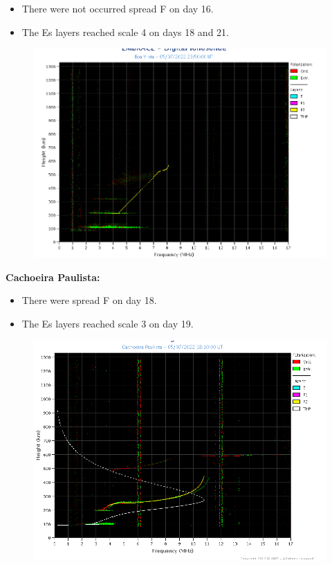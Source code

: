 \documentclass[a4paper, 10pt]{article}
\begin{document}
 \begin{itemize}
\item There were not occurred spread F on day 16.
\item The Es layers reached scale 4 on days 18 and 21.
\end{itemize}
\begin{figure}[H]
    
                        \centering
   
                             \includegraphics[width=14cm]{./figures//BoaVista.png}

                        \end{figure}

                     
\textbf{Cachoeira Paulista:}

 \begin{itemize}
\item There were spread F on day 18.
\item The Es layers reached scale 3 on day 19. 
\end{itemize}
\begin{figure}[H]
    
                        \centering
   
                             \includegraphics[width=14cm]{./figures//CachoeiraPaulista.png}

                        \end{figure}
\end{document}
